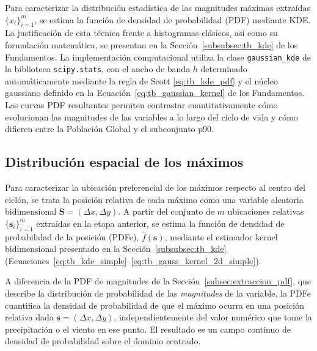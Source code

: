 Para caracterizar la distribución estadística de las magnitudes máximas extraídas $\{x_i\}_{i=1}^{m}$, se estima la función de densidad de probabilidad (PDF) mediante KDE. La justificación de esta técnica frente a histogramas clásicos, así como su formulación matemática, se presentan en la Sección~\ref{subsubsec:tb_kde} de los Fundamentos. La implementación computacional utiliza la clase \texttt{gaussian\_kde} de la biblioteca \texttt{scipy.stats}, con el ancho de banda $h$ determinado automáticamente mediante la regla de Scott \ref{eq:tb_kde_pdf} y el núcleo gaussiano definido en la Ecuación~\ref{eq:tb_gaussian_kernel} de los Fundamentos. Las curvas PDF resultantes permiten contrastar cuantitativamente cómo evolucionan las magnitudes de las variables a lo largo del ciclo de vida y cómo difieren entre la Población Global y el subconjunto p90.

\subsection{Distribución espacial de los máximos}\label{subsec:kde_localizacion}

Para caracterizar la ubicación preferencial de los máximos respecto al centro del ciclón, se trata la posición relativa de cada máximo como una variable aleatoria bidimensional $\mathbf{S} = (\Delta x, \Delta y)$. A partir del conjunto de $m$ ubicaciones relativas $\{\mathbf{s}_i\}_{i=1}^{m}$ extraídas en la etapa anterior, se estima la función de densidad de probabilidad de la posición (PDFe), $\hat{f}(\mathbf{s})$, mediante el estimador kernel bidimensional presentado en la Sección~\ref{subsubsec:tb_kde} (Ecuaciones~\ref{eq:tb_kde_simple}--\ref{eq:tb_gauss_kernel_2d_simple}).

A diferencia de la PDF de magnitudes de la Sección~\ref{subsec:extraccion_pdf}, que describe la distribución de probabilidad de las \emph{magnitudes} de la variable, la PDFe cuantifica la densidad de probabilidad de que el máximo ocurra en una posición relativa dada $\mathbf{s} = (\Delta x, \Delta y)$, independientemente del valor numérico que tome la precipitación o el viento en ese punto. El resultado es un campo continuo de densidad de probabilidad sobre el dominio centrado.



